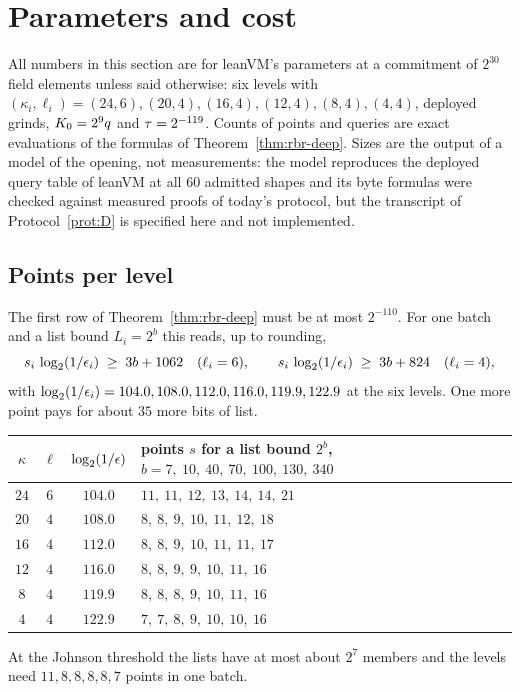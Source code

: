 \section{Parameters and cost}\label{sec:params}

All numbers in this section are for leanVM's parameters at a commitment of $2^{30}$ field elements unless said otherwise: six levels with $(\kappa_i,\ell_i)=(24,6),(20,4),(16,4),(12,4),(8,4),(4,4)$, deployed grinds, $K_0=2^9q$ and $\tau=2^{-119}$. Counts of points and queries are exact evaluations of the formulas of Theorem~\ref{thm:rbr-deep}. Sizes are the output of a model of the opening, not measurements: the model reproduces the deployed query table of leanVM at all $60$ admitted shapes and its byte formulas were checked against measured proofs of today's protocol, but the transcript of Protocol~\ref{prot:D} is specified here and not implemented.

\subsection{Points per level}\label{sec:points}

The first row of Theorem~\ref{thm:rbr-deep} must be at most $2^{-110}$. For one batch and a list bound $L_i=2^b$ this reads, up to rounding,
\[
s_i\,\log_2(1/\epsilon_i)\;\ge\;3b+1062\quad(\ell_i=6),\qquad s_i\,\log_2(1/\epsilon_i)\;\ge\;3b+824\quad(\ell_i=4),
\]
with $\log_2(1/\epsilon_i)=104.0,108.0,112.0,116.0,119.9,122.9$ at the six levels. One more point pays for about $35$ more bits of list.
\begin{center}
\small
\begin{tabular}{@{}cccl@{}}
\toprule
$\kappa$ & $\ell$ & $\log_2(1/\epsilon)$ & points $s$ for a list bound $2^b$, $b=7,\ 10,\ 40,\ 70,\ 100,\ 130,\ 340$\\
\midrule
$24$ & $6$ & $104.0$ & $11,\ 11,\ 12,\ 13,\ 14,\ 14,\ 21$\\
$20$ & $4$ & $108.0$ & $8,\ 8,\ 9,\ 10,\ 11,\ 12,\ 18$\\
$16$ & $4$ & $112.0$ & $8,\ 8,\ 9,\ 10,\ 11,\ 11,\ 17$\\
$12$ & $4$ & $116.0$ & $8,\ 8,\ 9,\ 9,\ 10,\ 11,\ 16$\\
$8$ & $4$ & $119.9$ & $8,\ 8,\ 8,\ 9,\ 10,\ 11,\ 16$\\
$4$ & $4$ & $122.9$ & $7,\ 7,\ 8,\ 9,\ 10,\ 10,\ 16$\\
\bottomrule
\end{tabular}
\end{center}
At the Johnson threshold the lists have at most about $2^7$ members and the levels need $11,8,8,8,8,7$ points in one batch.

